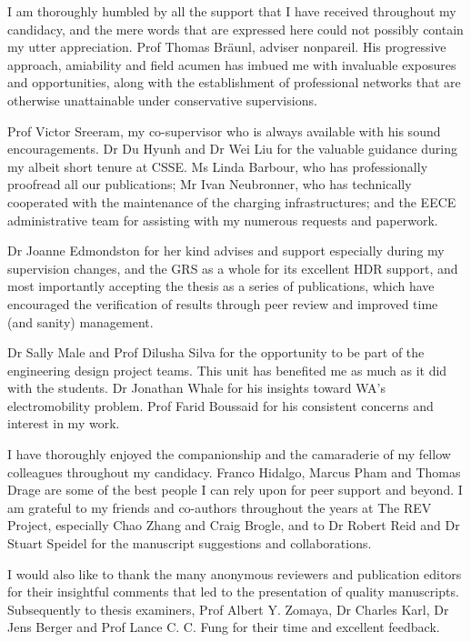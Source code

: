 
\begin{acknowledgements}      
I am thoroughly humbled by all the support that I have received throughout my candidacy, and the mere words that are expressed here could not possibly contain my utter appreciation. Prof Thomas Br\"aunl, adviser nonpareil. His progressive approach, amiability and field acumen has imbued me with invaluable exposures and opportunities, along with the establishment of professional networks that are otherwise unattainable under conservative supervisions.

Prof Victor Sreeram, my co-supervisor who is always available with his sound encouragements. Dr Du Hyunh and Dr Wei Liu for the valuable guidance during my albeit short tenure at CSSE. Ms Linda Barbour, who has professionally proofread all our publications; Mr Ivan Neubronner, who has technically cooperated with the maintenance of the charging infrastructures; and the EECE administrative team for assisting with my numerous requests and paperwork. 

Dr Joanne Edmondston for her kind advises and support especially during my supervision changes, and the GRS as a whole for its excellent HDR support, and most importantly accepting the thesis as a series of publications, which have encouraged the verification of results through peer review and improved time (and sanity) management. 

Dr Sally Male and Prof Dilusha Silva for the opportunity to be part of the engineering design project teams. This unit has benefited me as much as it did with the students. Dr Jonathan Whale for his insights toward WA's electromobility problem. Prof Farid Boussaid for his consistent concerns and interest in my work.  

I have thoroughly enjoyed the companionship and the camaraderie of my fellow colleagues throughout my candidacy. Franco Hidalgo, Marcus Pham and Thomas Drage are some of the best people I can rely upon for peer support and beyond. I am grateful to my friends and co-authors throughout the years at The REV Project, especially Chao Zhang and Craig Brogle, and to Dr Robert Reid and Dr Stuart Speidel for the manuscript suggestions and collaborations. 

I would also like to thank the many anonymous reviewers and publication editors for their insightful comments that led to the presentation of quality manuscripts. Subsequently to thesis examiners, Prof Albert Y. Zomaya, Dr Charles Karl, Dr Jens Berger and Prof Lance C. C. Fung for their time and excellent feedback. %


\end{acknowledgements}
